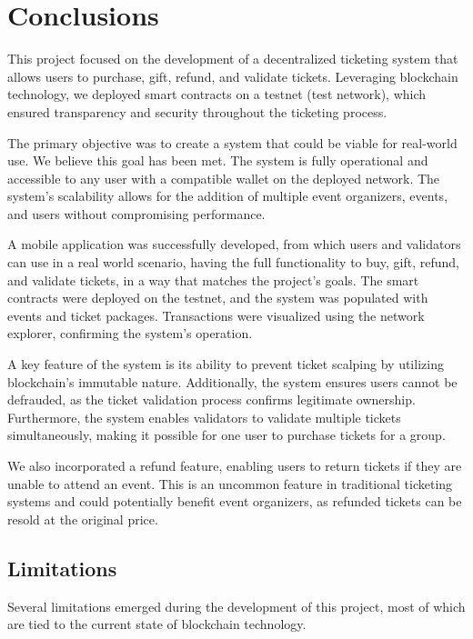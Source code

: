\chapter{Conclusions}\label{ch:conclusions}

This project focused on the development of a decentralized ticketing system
that allows users to purchase, gift, refund, and validate tickets. Leveraging
blockchain technology, we deployed smart contracts on a testnet (test network),
which ensured transparency and security throughout the ticketing process.

The primary objective was to create a system that could be viable for
real-world use. We believe this goal has been met. The system is fully
operational and accessible to any user with a compatible wallet on the deployed
network. The system's scalability allows for the addition of multiple event
organizers, events, and users without compromising performance.

A mobile application was successfully developed, from which users and
validators can use in a real world scenario, having the full functionality to
buy, gift, refund, and validate tickets, in a way that matches the project's
goals. The smart contracts were deployed on the testnet, and the system was
populated with events and ticket packages. Transactions were visualized using
the network explorer, confirming the system's operation.

A key feature of the system is its ability to prevent ticket scalping by
utilizing blockchain's immutable nature. Additionally, the system ensures users
cannot be defrauded, as the ticket validation process confirms legitimate
ownership. Furthermore, the system enables validators to validate multiple
tickets simultaneously, making it possible for one user to purchase tickets for
a group.

We also incorporated a refund feature, enabling users to return tickets if they
are unable to attend an event. This is an uncommon feature in traditional
ticketing systems and could potentially benefit event organizers, as refunded
tickets can be resold at the original price.

\section{Limitations}\label{sec:limitations}

Several limitations emerged during the development of this project, most of
which are tied to the current state of blockchain technology.

